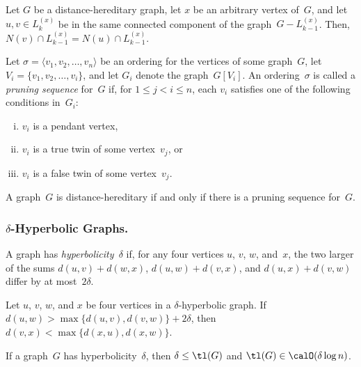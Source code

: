 \begin{lemma}
    \label{lem:prelDistHere}
Let \( G \) be a distance-hereditary graph, let \( x \) be an arbitrary vertex of~\( G \), and let \( u, v \in L_k^{(x)} \) be in the same connected component of the graph~\( G - L_{k-1}^{(x)} \).
Then, \( N(v) \cap L_{k-1}^{(x)} = N(u) \cap L_{k-1}^{(x)} \).
\end{lemma}

Let $\sigma = \langle v_1, v_2, \ldots, v_n \rangle$ be an ordering for the vertices of some graph~$G$, let $V_i = \{ v_1, v_2, \ldots, v_i \}$, and let $G_i$ denote the graph~$G[V_i]$.
An ordering~$\sigma$ is called a \emph{pruning sequence} for~$G$ if, for $1 \leq j < i \leq n$, each $v_i$ satisfies one of the following conditions in~$G_i$:
\begin{enumerate}[(i)]
    \item
        $v_i$ is a pendant vertex,
    \item
        $v_i$ is a true twin of some vertex~$v_j$, or
    \item
        $v_i$ is a false twin of some vertex~$v_j$.
\end{enumerate}

\begin{lemma}
    \label{lem:punSeq}
A graph~\( G \) is distance-hereditary if and only if there is a pruning sequence for~\( G \).
\end{lemma}

\subsubsection{\texorpdfstring{$\delta$}{δ}-Hyperbolic Graphs.}

A graph has \emph{hyperbolicity~\( \delta \)} if, for any four vertices $u$, $v$, $w$, and~$x$, the two larger of the sums $d(u, v) + d(w, x)$, $d(u, w) + d(v, x)$, and $d(u, x) + d(v, w)$ differ by at most~$2 \delta$.

\begin{lemma}
    \label{lem:deltaHyper}
Let \( u \), \( v \), \( w \), and \( x \) be four vertices in a \( \delta \)-hyperbolic graph.
If \( d(u, w) > \max \big \{ d(u, v), d(v, w) \big \} + 2 \delta \), then \( d(v, x) < \max \big \{ d(x, u), d(x, w) \big \} \).
\end{lemma}

\begin{theorem}
    \label{theo:hyperbolicTreeLength}
If a graph~\( G \) has hyperbolicity~\( \delta \), then \( \delta \leq \tl(G) \) and \( \tl(G) \in \calO(\delta \log n) \).
\end{theorem}


